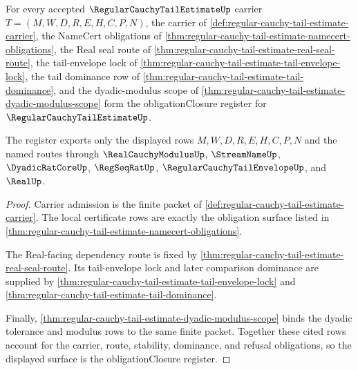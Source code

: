 \begin{theorem}
\label{thm:regular-cauchy-tail-estimate-obligation-register}
For every accepted $\RegularCauchyTailEstimateUp$ carrier $T=(M,W,D,R,E,H,C,P,N)$, the carrier of \autoref{def:regular-cauchy-tail-estimate-carrier}, the NameCert obligations of \autoref{thm:regular-cauchy-tail-estimate-namecert-obligations}, the Real seal route of \autoref{thm:regular-cauchy-tail-estimate-real-seal-route}, the tail-envelope lock of \autoref{thm:regular-cauchy-tail-estimate-tail-envelope-lock}, the tail dominance row of \autoref{thm:regular-cauchy-tail-estimate-tail-dominance}, and the dyadic-modulus scope of \autoref{thm:regular-cauchy-tail-estimate-dyadic-modulus-scope} form the obligationClosure register for $\RegularCauchyTailEstimateUp$.

The register exports only the displayed rows $M,W,D,R,E,H,C,P,N$ and the named routes through $\RealCauchyModulusUp$, $\StreamNameUp$, $\DyadicRatCoreUp$, $\RegSeqRatUp$, $\RegularCauchyTailEnvelopeUp$, and $\RealUp$.
\end{theorem}
\begin{proof}
Carrier admission is the finite packet of \autoref{def:regular-cauchy-tail-estimate-carrier}. The local certificate rows are exactly the obligation surface listed in \autoref{thm:regular-cauchy-tail-estimate-namecert-obligations}.

The Real-facing dependency route is fixed by \autoref{thm:regular-cauchy-tail-estimate-real-seal-route}. Its tail-envelope lock and later comparison dominance are supplied by \autoref{thm:regular-cauchy-tail-estimate-tail-envelope-lock} and \autoref{thm:regular-cauchy-tail-estimate-tail-dominance}.

Finally, \autoref{thm:regular-cauchy-tail-estimate-dyadic-modulus-scope} binds the dyadic tolerance and modulus rows to the same finite packet. Together these cited rows account for the carrier, route, stability, dominance, and refusal obligations, so the displayed surface is the obligationClosure register.
\end{proof}

